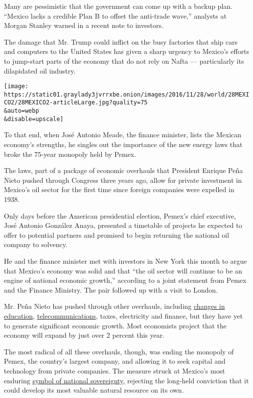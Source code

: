Many are pessimistic that the government can come up with a backup plan.
``Mexico lacks a credible Plan B to offset the anti-trade wave,''
analysts at Morgan Stanley warned in a recent note to investors.

The damage that Mr. Trump could inflict on the busy factories that ship
cars and computers to the United States has given a sharp urgency to
Mexico's efforts to jump-start parts of the economy that do not rely on
Nafta --- particularly its dilapidated oil industry.

\texttt{[image: https://static01.graylady3jvrrxbe.onion/images/2016/11/28/world/28MEXICO2/28MEXICO2-articleLarge.jpg?quality=75\\\&auto=webp\\\&disable=upscale]}

To that end, when José Antonio Meade, the finance minister, lists the
Mexican economy's strengths, he singles out the importance of the new
energy laws that broke the 75-year monopoly held by Pemex.

The laws, part of a package of economic overhauls that President Enrique
Peña Nieto pushed through Congress three years ago, allow for private
investment in Mexico's oil sector for the first time since foreign
companies were expelled in 1938.

Only days before the American presidential election, Pemex's chief
executive, José Antonio González Anaya, presented a timetable of
projects he expected to offer to potential partners and promised to
begin returning the national oil company to solvency.

He and the finance minister met with investors in New York this month to
argue that Mexico's economy was solid and that ``the oil sector will
continue to be an engine of national economic growth,'' according to a
joint statement from Pemex and the Finance Ministry. The pair followed
up with a visit to London.

Mr. Peña Nieto has pushed through other overhauls, including
\href{http://www.nytimes3xbfgragh.onion/2016/06/27/world/americas/mexico-teachers-protests-enrique-pena-nieto.html}{changes
in education},
\href{http://www.nytimes3xbfgragh.onion/2016/08/10/world/americas/mexicos-carlos-slim-helu.html?_r=0}{telecommunications},
taxes, electricity and finance, but they have yet to generate
significant economic growth. Most economists project that the economy
will expand by just over 2 percent this year.

The most radical of all these overhauls, though, was ending the monopoly
of Pemex, the country's largest company, and allowing it to seek capital
and technology from private companies. The measure struck at Mexico's
most enduring
\href{http://www.nytimes3xbfgragh.onion/2013/12/13/world/americas/mexico-oil.html}{symbol
of national sovereignty}, rejecting the long-held conviction that it
could develop its most valuable natural resource on its own.


